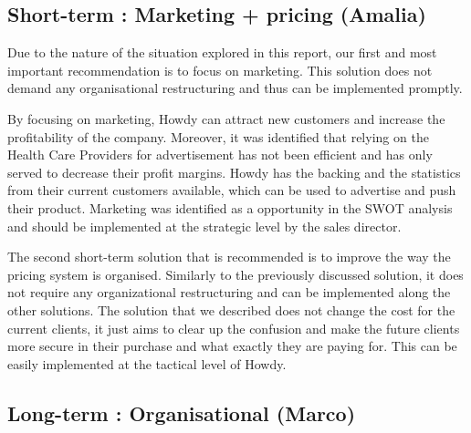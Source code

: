 
\subsection{Short-term : Marketing + pricing (Amalia)}
Due to the nature of the situation explored in this report, our first and most important recommendation is to focus on marketing. This solution does not demand any organisational restructuring and thus can be implemented promptly.

\noindent By focusing on marketing, Howdy can attract new customers and increase the profitability of the company. Moreover, it was identified that relying on the Health Care Providers for advertisement has not been efficient and has only served to decrease their profit margins. Howdy has the backing and the statistics from their current customers available, which can be used to advertise and push their product. Marketing was identified as a opportunity in the SWOT analysis and should be implemented at the strategic level by the sales director.

\noindent The second short-term solution that is recommended is to improve the way the pricing system is organised. Similarly to the previously discussed solution, it does not require any organizational restructuring and can be implemented along the other solutions. The solution that we described does not change the cost for the current clients, it just aims to clear up the confusion and make the future clients more secure in their purchase and what exactly they are paying for. This can be easily implemented at the tactical level of Howdy. 


\subsection{Long-term : Organisational (Marco)}

